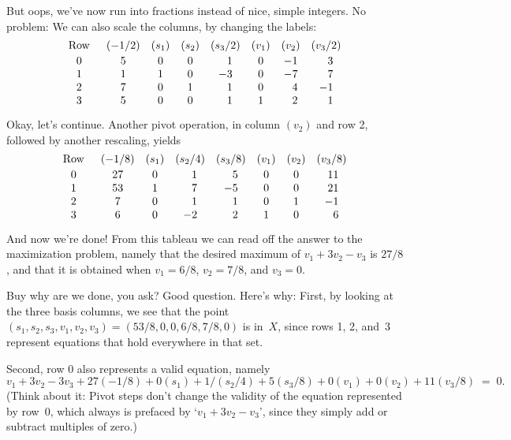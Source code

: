 \fi

But oops, we've now run into fractions instead of nice, simple
integers.
No problem: We can also scale the columns, by changing the labels:
$$\def\\{\phantom-}
\vcenter{\halign{\hfil$#$\hfil\enspace&&\quad\hfil$#$\hfil\cr
\rm Row&(-1/2)&(s_1)&(s_2)&(s_3/2)&(v_1)&(v_2)&(v_3/2)\cr
\noalign{\vskip2pt}
0&5&0&0&\\1&0&-1&\\3\cr
1&1&1&0&-3&0&-7&\\7\cr
2&7&0&1&\\1&0&\\4&-1\cr
3&5&0&0&\\1&1&\\2&\\1\cr}}$$

\fi

Okay, let's continue.
Another pivot operation, in column $(v_2)$ and row 2, followed by
another rescaling, yields
$$\def\\{\phantom-}
\vcenter{\halign{\hfil$#$\hfil\enspace&&\quad\hfil$#$\hfil\cr
\rm Row&(-1/8)&(s_1)&(s_2/4)&(s_3/8)&(v_1)&(v_2)&(v_3/8)\cr
\noalign{\vskip2pt}
0&27&0&\\1&\\5&0&0&\\\llap11\cr
1&53&1&\\7&-5&0&0&\\\llap21\cr
2&7&0&\\1&\\1&0&1&-1\cr
3&6&0&-2&\\2&1&0&\\6\cr}}$$

\fi

And now we're done! From this tableau we can read off the
answer to the
maximization problem, namely that the desired maximum of $v_1+3v_2-v_3$ is
$27/8$, and that it is obtained when $v_1=6/8$, $v_2=7/8$, and $v_3=0$.

Buy why are we done, you ask? Good question. Here's why: First, by looking at
the three basis columns, we see that the point $(s_1,s_2,s_3,v_1,v_2,v_3)=
(53/8,0,0,6/8,7/8,0)$ is in~$X$, since rows 1, 2, and~3 represent equations
that hold everywhere in that set.

Second, row 0 also represents a valid equation, namely
$$v_1+3v_2-3v_3+27(-1/8)+0(s_1)+1/(s_2/4)+5(s_3/8)+0(v_1)+0(v_2)+11(v_3/8)
\;=\;0.$$
(Think about it: Pivot steps don't change the validity of the equation
represented by row~0, which always is prefaced by `$v_1+3v_2-v_3$',
since they simply add or subtract multiples of zero.)

